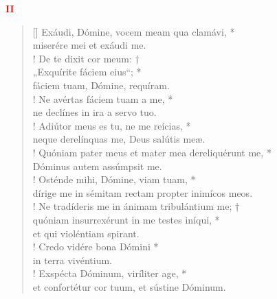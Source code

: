 \begin{center}
\textcolor{red}{\bf II}
\end{center}
\begin{verse}[\versewidth]
Exáudi, Dómine, vocem meam qua clamávi, *\\
miserére mei et exáudi me.\\!
\vin De te dixit cor meum: †\\
\vin „Exquírite fáciem eius“; *\\
\vin fáciem tuam, Dómine, requíram.\\!
Ne avértas fáciem tuam a me, *\\
ne declínes in ira a servo tuo.\\!
\vin Adiútor meus es tu, ne me reícias, *\\
\vin neque derelínquas me, Deus salútis meæ.\\!
Quóniam pater meus et mater mea dereliquérunt me, *\\
Dóminus autem assúmpsit me.\\!
\vin Osténde mihi, Dómine, viam tuam, *\\
\vin dírige me in sémitam rectam propter inimícos meos.\\!
Ne tradíderis me in ánimam tribulántium me; †\\
quóniam insurrexérunt in me testes iníqui, *\\
et qui violéntiam spirant.\\!
\vin Credo vidére bona Dómini *\\
\vin in terra vivéntium.\\!
Exspécta Dóminum, viríliter age, *\\
et confortétur cor tuum, et sústine Dóminum.\\
\end{verse}
\vspace{1cm}


